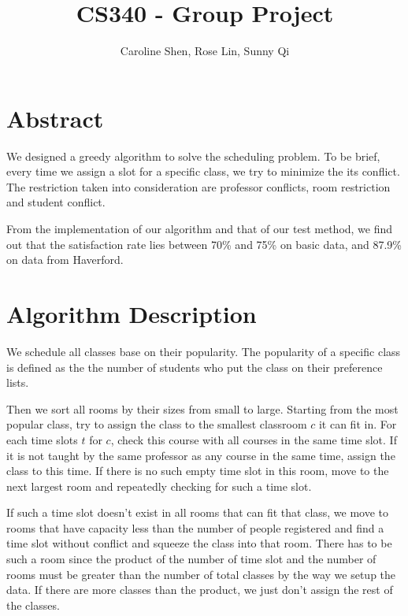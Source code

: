 \documentclass[11pt, oneside]{article}   	%
\title{CS340 - Group Project}
\author{Caroline Shen, Rose Lin, Sunny Qi}
\date{}							%
\begin{document}
\maketitle
\section{Abstract}
We designed a greedy algorithm to solve the scheduling problem. To be brief, every time we assign a slot for a specific class, we try to minimize the its conflict. The restriction taken into consideration are professor conflicts, room restriction and student conflict.

From the implementation of our algorithm and that of our test method, we find out that the satisfaction rate lies between 70\% and 75\% on basic data, and 87.9\% on data from Haverford. 


\section{Algorithm Description}
We schedule all classes base on their popularity. The popularity of a specific class is defined as the the number of students who put the class on their preference lists.

Then we sort all rooms by their sizes from small to large. Starting from the most popular class, try to assign the class to the smallest classroom $c$ it can fit in. For each time slots $t$ for $c$, check this course with all courses in the same time slot. If it is not taught by the same professor as any course in the same time, assign the class to this time. If there is no such empty time slot in this room, move to the next largest room and repeatedly checking for such a time slot. 

If such a time slot doesn't exist in all rooms that can fit that class, we move to rooms that have capacity less than the number of people registered and find a time slot without conflict and squeeze the class into that room. There has to be such a room since the product of the number of time slot and the number of rooms must be greater than the number of total classes by the way we setup the data. If there are more classes than the product, we just don't assign the rest of the classes.
\end{document}
